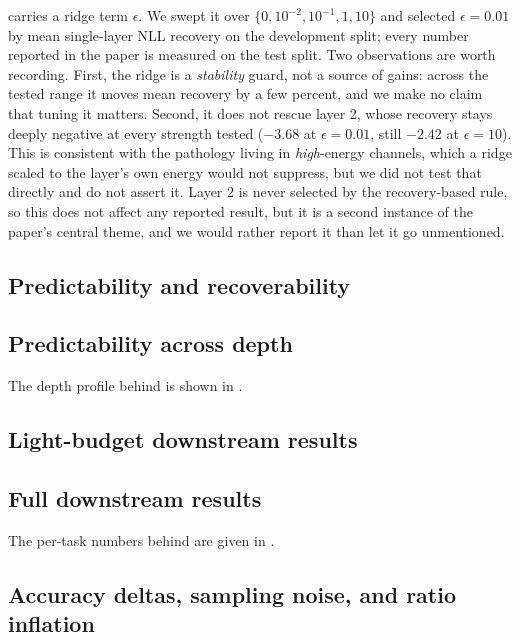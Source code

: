  carries a ridge term $\epsilon$. We swept it over
$\{0, 10^{-2}, 10^{-1}, 1, 10\}$ and selected $\epsilon = 0.01$ by mean
single-layer NLL recovery on the development split; every number reported in the
paper is measured on the test split. Two observations are worth recording. First,
the ridge is a \emph{stability} guard, not a source of gains: across the tested
range it moves mean recovery by a few percent, and we make no claim that tuning it
matters. Second, it does not rescue layer 2, whose recovery stays deeply negative
at every strength tested ($-3.68$ at $\epsilon=0.01$, still $-2.42$ at
$\epsilon=10$). This is consistent with the pathology living in \emph{high}-energy
channels, which a ridge scaled to the layer's own energy would not suppress, but we did
not test that directly and do not assert it. Layer 2 is never selected
by the recovery-based rule, so this does not affect any reported result, but it
is a second instance of the paper's central theme, and we would rather report it
than let it go unmentioned.

\subsection{Predictability and recoverability}


\subsection{Predictability across depth}


The depth profile behind  is shown in .

\subsection{Light-budget downstream results}


\subsection{Full downstream results}
\label{sec:app-downstream}



The per-task numbers behind  are given in .

\subsection{Accuracy deltas, sampling noise, and ratio inflation}
\label{sec:app-noise}

